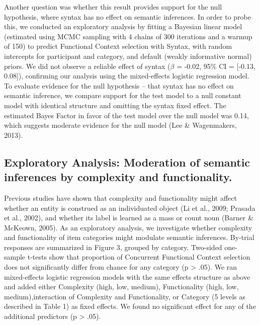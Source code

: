\documentclass[
  man,floatsintext]{apa6}
\begin{document}
Another question was whether this result provides support for the null hypothesis, where syntax has no effect on semantic inferences. In order to probe this, we conducted an exploratory analysis by fitting a Bayesian linear model (estimated using MCMC sampling with 4 chains of 300 iterations and a warmup of 150) to predict Functional Context selection with Syntax, with random intercepts for participant and category, and default (weakly informative normal) priors. We did not observe a reliable effect of syntax (\(\beta\) = -0.02, 95\% CI = {[}-0.13, 0.08{]}), confirming our analysis using the mixed-effects logistic regression model. To evaluate evidence for the null hypothesis -- that syntax has no effect on semantic inference, we compare support for the test model to a null constant model with identical structure and omitting the syntax fixed effect. The estimated Bayes Factor in favor of the test model over the null model was 0.14, which suggests moderate evidence for the null model (Lee \& Wagenmakers, 2013).

\hypertarget{exploratory-analysis-moderation-of-semantic-inferences-by-complexity-and-functionality.}{%
\subsection{Exploratory Analysis: Moderation of semantic inferences by complexity and functionality.}\label{exploratory-analysis-moderation-of-semantic-inferences-by-complexity-and-functionality.}}

Previous studies have shown that complexity and functionality might affect whether an entity is construed as an individuated object (Li et al., 2009; Prasada et al., 2002), and whether its label is learned as a mass or count noun (Barner \& McKeown, 2005). As an exploratory analysis, we investigate whether complexity and functionality of item categories might modulate semantic inferences. By-trial responses are summarized in Figure 3, grouped by category. Two-sided one-sample t-tests show that proportion of Concurrent Functional Context selection does not significantly differ from chance for any category (p \textgreater{} .05). We ran mixed-effects logistic regression models with the same effects structure as above and added either Complexity (high, low, medium), Functionality (high, low, medium),interaction of Complexity and Functionality, or Category (5 levels as described in Table 1) as fixed effects. We found no significant effect for any of the additional predictors (p \textgreater{} .05).
\end{document}
